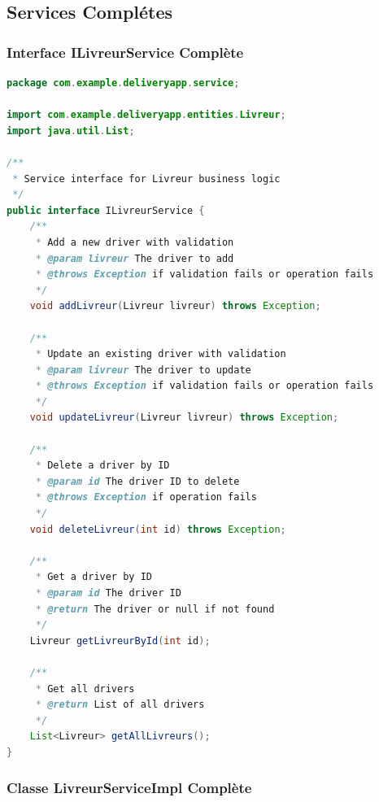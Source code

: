 \documentclass{rapportENSIAS}
\begin{document}
\subsection{Services Compl\'{e}tes}

\subsubsection{Interface ILivreurService Compl\`{e}te}

\begin{lstlisting}[language=Java, caption=Interface ILivreurService compl\`{e}te]
package com.example.deliveryapp.service;

import com.example.deliveryapp.entities.Livreur;
import java.util.List;

/**
 * Service interface for Livreur business logic
 */
public interface ILivreurService {
    /**
     * Add a new driver with validation
     * @param livreur The driver to add
     * @throws Exception if validation fails or operation fails
     */
    void addLivreur(Livreur livreur) throws Exception;
    
    /**
     * Update an existing driver with validation
     * @param livreur The driver to update
     * @throws Exception if validation fails or operation fails
     */
    void updateLivreur(Livreur livreur) throws Exception;
    
    /**
     * Delete a driver by ID
     * @param id The driver ID to delete
     * @throws Exception if operation fails
     */
    void deleteLivreur(int id) throws Exception;
    
    /**
     * Get a driver by ID
     * @param id The driver ID
     * @return The driver or null if not found
     */
    Livreur getLivreurById(int id);
    
    /**
     * Get all drivers
     * @return List of all drivers
     */
    List<Livreur> getAllLivreurs();
}
\end{lstlisting}

\subsubsection{Classe LivreurServiceImpl Compl\`{e}te}
\end{document}
